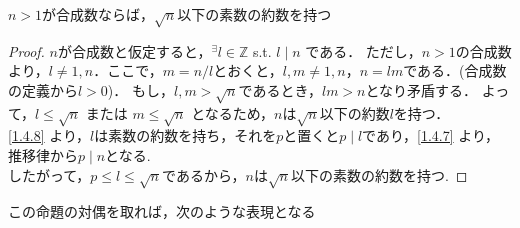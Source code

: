 



% 

    \begin{prop} \label{1.4.9}
      $n>1$が合成数ならば，$\sqrt{n}$以下の素数の約数を持つ
    \end{prop}

    \begin{proof}
      $n$が合成数と仮定すると，$^{\exists}l \in \mathbb{Z}$ s.t. $l \mid n$ である．
      ただし，$n>1$の合成数より，$ l \neq 1, n$．ここで，$m=n/l$とおくと，$l,m \neq 1,n$，$n = lm$である．(合成数の定義から$l>0$)．
      もし，$l,m > \sqrt{n}$であるとき，$lm > n$となり矛盾する．
      よって，$l \leq \sqrt{n}$ または $m \leq \sqrt{n}$ となるため，$n$は$\sqrt{n}$以下の約数$l$を持つ． \\
      \cref{1.4.8} より，$l$は素数の約数を持ち，それを$p$と置くと$ p \mid l$であり，\cref{1.4.7} より，推移律から$p \mid n$となる. \\
      したがって，$p \leq l \leq \sqrt{n}$であるから，$n$は$\sqrt{n}$以下の素数の約数を持つ.
    \end{proof}

    この命題の対偶を取れば，次のような表現となる

